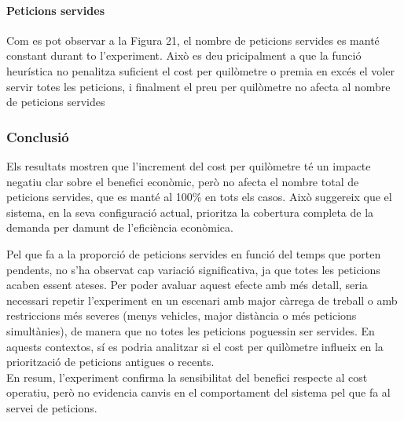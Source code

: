 \paragraph{Peticions servides}
Com es pot observar a la Figura 21, el nombre de peticions servides es manté constant durant to l'experiment. Això es deu pricipalment a que la funció heurística no penalitza suficient el cost per quilòmetre o premia en excés el voler servir totes les peticions, i finalment el preu per quilòmetre no afecta al nombre de peticions servides 


\vspace{0.5cm}


\subsubsection{Conclusió}
Els resultats mostren que l'increment del cost per quilòmetre té un impacte negatiu clar sobre el benefici econòmic, però no afecta el nombre total de peticions servides, que es manté al 100\% en tots els casos. Això suggereix que el sistema, en la seva configuració actual, prioritza la cobertura completa de la demanda per damunt de l’eficiència econòmica.
  
Pel que fa a la proporció de peticions servides en funció del temps que porten pendents, no s'ha observat cap variació significativa, ja que totes les peticions acaben essent ateses. Per poder avaluar aquest efecte amb més detall, seria necessari repetir l’experiment en un escenari amb major càrrega de treball o amb restriccions més severes (menys vehicles, major distància o més peticions simultànies), de manera que no totes les peticions poguessin ser servides. En aquests contextos, sí es podria analitzar si el cost per quilòmetre influeix en la priorització de peticions antigues o recents. \\

En resum, l'experiment confirma la sensibilitat del benefici respecte al cost operatiu, però no evidencia canvis en el comportament del sistema pel que fa al servei de peticions.